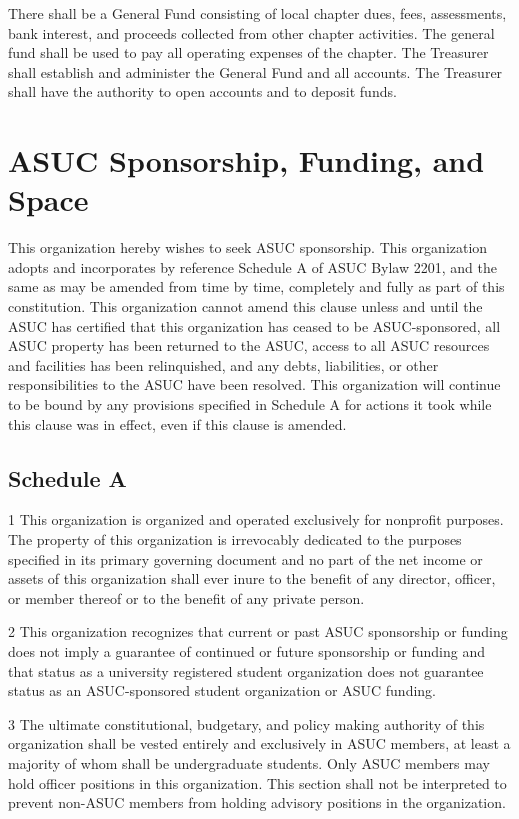 \documentclass[11pt]{article}
\begin{document}
There shall be a General Fund consisting of local chapter dues, fees, assessments, bank interest, and proceeds collected from other chapter activities.
The general fund shall be used to pay all operating expenses of the chapter.
The Treasurer shall establish and administer the General Fund and all accounts.
The Treasurer shall have the authority to open accounts and to deposit funds.
\section{ASUC Sponsorship, Funding, and Space}
\label{sec:org2389317}

This organization hereby wishes to seek ASUC sponsorship.
This organization adopts and incorporates by reference Schedule A of ASUC Bylaw 2201, and the same as may be amended from time by time, completely and fully as part of this constitution.
This organization cannot amend this clause unless and until the ASUC has certified that this organization has ceased to be ASUC-sponsored, all ASUC property has been returned to the ASUC, access to all ASUC resources and facilities has been relinquished, and any debts, liabilities, or other responsibilities to the ASUC have been resolved.
This organization will continue to be bound by any provisions specified in Schedule A for actions it took while this clause was in effect, even if this clause is amended.

\subsection{Schedule A}
\label{sec:org6d5f202}

1 This organization is organized and operated exclusively for nonprofit purposes.
The property of this organization is irrevocably dedicated to the purposes specified in its primary governing document and no part of the net income or assets of this organization shall ever inure to the benefit of any director, officer, or member thereof or to the benefit of any private person.

2 This organization recognizes that current or past ASUC sponsorship or funding does not imply a guarantee of continued or future sponsorship or funding and that status as a university registered student organization does not guarantee status as an ASUC-sponsored student organization or ASUC funding.

3 The ultimate constitutional, budgetary, and policy making authority of this organization shall be vested entirely and exclusively in ASUC members, at least a majority of whom shall be undergraduate students.
Only ASUC members may hold officer positions in this organization.
This section shall not be interpreted to prevent non-ASUC members from holding advisory positions in the organization.
\end{document}
